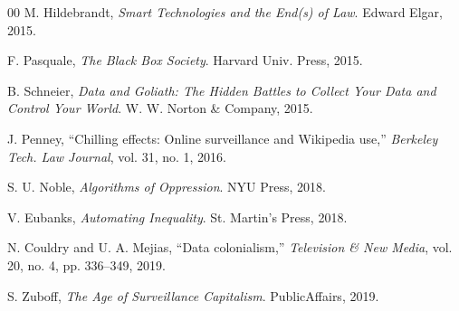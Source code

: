 \documentclass[conference]{IEEEtran}
\begin{document}
\begin{thebibliography}{00}
 M. Hildebrandt, \textit{Smart Technologies and the End(s) of Law}. Edward Elgar, 2015.

 F. Pasquale, \textit{The Black Box Society}. Harvard Univ. Press, 2015.

 B. Schneier, \textit{Data and Goliath: The Hidden Battles to Collect Your Data and Control Your World}. W. W. Norton \& Company, 2015.

 J. Penney, ``Chilling effects: Online surveillance and Wikipedia use,'' \textit{Berkeley Tech. Law Journal}, vol. 31, no. 1, 2016.

 S. U. Noble, \textit{Algorithms of Oppression}. NYU Press, 2018.

 V. Eubanks, \textit{Automating Inequality}. St. Martin's Press, 2018.

 N. Couldry and U. A. Mejias, ``Data colonialism,'' \textit{Television \& New Media}, vol. 20, no. 4, pp. 336--349, 2019.

 S. Zuboff, \textit{The Age of Surveillance Capitalism}. PublicAffairs, 2019.

\end{thebibliography}
\end{document}
